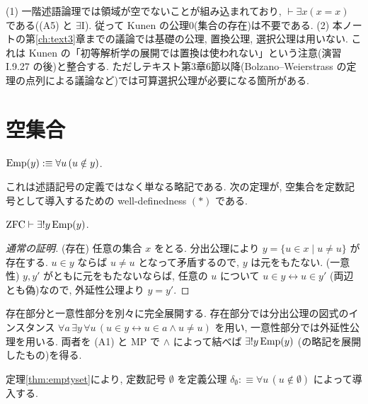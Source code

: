 \begin{rem}
  (1) 一階述語論理では領域が空でないことが組み込まれており, $\vdash \exists x(x = x)$ である((A5) と $\exists$I). 従って Kunen の公理0(集合の存在)は不要である.
  (2) 本ノートの第\ref{ch:text3}章までの議論では基礎の公理, 置換公理, 選択公理は用いない. これは Kunen \cite{kunen2011} の「初等解析学の展開では置換は使われない」という注意(演習 I.9.27 の後)と整合する. ただしテキスト第3章6節以降(Bolzano--Weierstrass の定理の点列による議論など)では可算選択公理が必要になる箇所がある.
\end{rem}

\section{空集合}

\begin{dfn}
  $\mathrm{Emp}(y) :\equiv \forall u\,(u \notin y)$.
\end{dfn}

これは述語記号の定義ではなく単なる略記である. 次の定理が, 空集合を定数記号として導入するための well-definedness $(\ast)$ である.

\begin{thm}\label{thm:emptyset}
  $\mathrm{ZFC} \vdash \exists ! y\,\mathrm{Emp}(y)$.
\end{thm}
\begin{proof}[通常の証明]
  (存在) 任意の集合 $x$ をとる. 分出公理により $y = \{u \in x \mid u \neq u\}$ が存在する. $u \in y$ ならば $u \neq u$ となって矛盾するので, $y$ は元をもたない.
  (一意性) $y, y'$ がともに元をもたないならば, 任意の $u$ について $u \in y \leftrightarrow u \in y'$ (両辺とも偽)なので, 外延性公理より $y = y'$.
\end{proof}

存在部分と一意性部分を別々に完全展開する. 存在部分では分出公理の図式のインスタンス $\forall a\,\exists y\,\forall u\,(u \in y \leftrightarrow u \in a \land u \neq u)$ を用い, 一意性部分では外延性公理を用いる. 両者を (A1) と MP で $\land$ によって結べば $\exists ! y\,\mathrm{Emp}(y)$ (の略記を展開したもの)を得る.

\begin{dfn}[空集合]\label{dfn:emptyset}
  定理\ref{thm:emptyset}により, 定数記号 $\emptyset$ を定義公理 $\delta_\emptyset :\equiv \forall u\,(u \notin \emptyset)$ によって導入する.
\end{dfn}

